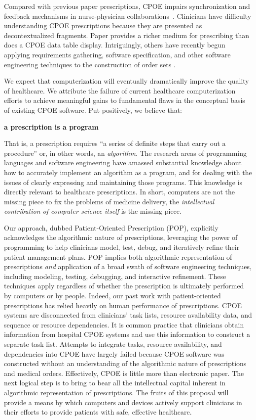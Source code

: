 \documentclass[11pt]{article}
\begin{document}
Compared with previous paper prescriptions, CPOE impairs
synchronization and feedback mechanisms in nurse-physician
collaborations~\citep{Pirnejad2008}.
%
Clinicians have difficulty understanding CPOE prescriptions because
they are presented as decontextualized fragments.
%
Paper provides a richer medium for prescribing than does a CPOE data
table display.
%
Intriguingly, others have recently begun applying
requirements gathering, software specification, and other software
engineering techniques to the construction of order sets
\citep{health-requirements-engineering}.


We expect that computerization will eventually dramatically improve the quality of healthcare. We attribute the failure of current healthcare computerization efforts to achieve meaningful gains to fundamental flaws in the conceptual basis of existing CPOE software. 
%
Put positively, we believe that:
%
\begin{center}
\textbf{a prescription is a program}
\end{center}
%
That is, a prescription requires ``a series of definite steps that
carry out a procedure'' or, in other words, an \emph{algorithm}.
%
The research areas of programming languages and software engineering
have amassed substantial knowledge about how to accurately implement an
algorithm as a program, and for dealing with the issues of clearly expressing and maintaining those programs. This knowledge is directly relevant to healthcare prescriptions.
%
In short, computers are not the missing piece to fix the problems of
medicine delivery, the \emph{intellectual contribution of computer
  science itself} is the missing piece.

Our approach, dubbed Patient-Oriented Prescription (POP), explicitly
acknowledges the algorithmic nature of prescriptions, leveraging the
power of programming to help clinicians model, test, debug, and
iteratively refine their patient management plans.
%
POP implies both algorithmic representation of prescriptions
\emph{and} application of a broad swath of software engineering
techniques, including modeling, testing, debugging, and interactive
refinement.
%
These techniques apply regardless of whether the prescription is
ultimately performed by computers or by people.
%
Indeed, our past work with patient-oriented prescriptions has
relied heavily on human performance of prescriptions.
%
CPOE systems are disconnected from clinicians' task lists,  resource availability data, and sequence or resource dependencies. It is common practice that clinicians obtain information from hospital CPOE systems and use this information to construct a separate task list. Attempts to integrate tasks, resource availability, and dependencies into CPOE have largely failed because CPOE software was constructed without an understanding of the algorithmic nature of prescriptions and medical orders. Effectively, CPOE is little more than electronic paper.
%
The next logical step is to bring to bear all the intellectual capital
inherent in algorithmic representation of prescriptions.
%
The fruits of this proposal will provide a means by which computers
and devices actively support clinicians in their efforts to provide
patients with safe, effective healthcare.
\end{document}
